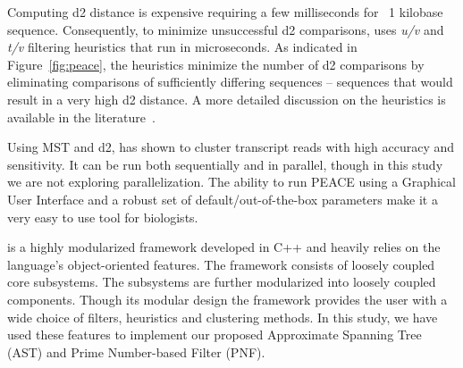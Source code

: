 Computing d2 distance is expensive requiring a few milliseconds for ~1
kilobase sequence.  Consequently, to minimize unsuccessful d2
comparisons, \peace\/ uses \emph{u/v} and \emph{t/v} filtering
heuristics that run in microseconds.  As indicated in
Figure~\ref{fig:peace}, the heuristics minimize the number of d2
comparisons by eliminating comparisons of sufficiently differing
sequences -- \ie\/ sequences that would result in a very high d2
distance.  A more detailed discussion on the heuristics is available
in the literature~\cite{rao-10}.

Using MST and d2, \peace\/ has shown to cluster transcript reads with
high accuracy and sensitivity. It can be run both sequentially and in
parallel, though in this study we are not exploring parallelization.
The ability to run PEACE using a Graphical User Interface and a robust
set of default/out-of-the-box parameters make it a very easy to use
tool for biologists.

\peace\/ is a highly modularized framework developed in C++ and
heavily relies on the language's object-oriented features.  The
framework consists of loosely coupled core subsystems. The subsystems
are further modularized into loosely coupled components.  Though its
modular design the framework provides the user with a wide choice of
filters, heuristics and clustering methods.  In this study, we have
used these features to implement our proposed Approximate Spanning
Tree (AST) and Prime Number-based Filter (PNF).

